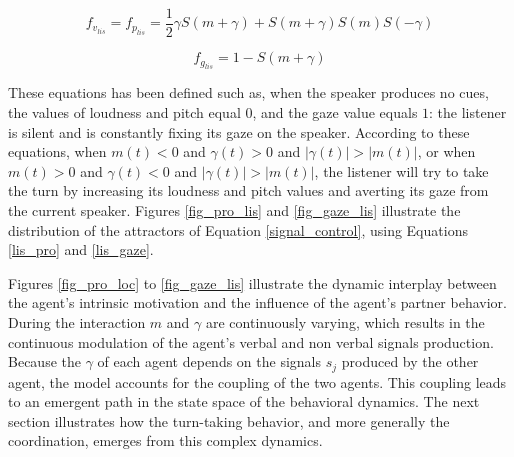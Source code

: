 \begin{equation}
f_{v_{lis}}= f_{p_{lis}} = \frac{1}{2} \gamma S(m+\gamma) + S(m+\gamma)S(m)S(-\gamma)
\label{lis_pro}
\end{equation}

\begin{equation}
f_{g_{lis}} = 1 - S(m + \gamma)
\label{lis_gaze}
\end{equation}

These equations has been defined such as, when the speaker produces no cues, the values of loudness and pitch equal $0$, and the gaze value equals $1$: the listener is silent and is constantly fixing its gaze on the speaker. 
According to these equations, when $m(t)<0$ and $\gamma(t)>0$ and $|\gamma(t)|>|m(t)|$, or when $m(t)>0$ and $\gamma(t)<0$ and $|\gamma(t)|>|m(t)|$, the listener will try to take the turn by increasing its loudness and pitch values and averting its gaze from the current speaker. Figures \ref{fig_pro_lis} and \ref{fig_gaze_lis} illustrate the distribution of the attractors of Equation \ref{signal_control}, using Equations \ref{lis_pro} and \ref{lis_gaze}.

Figures \ref{fig_pro_loc} to \ref{fig_gaze_lis} illustrate the dynamic interplay between the agent's intrinsic motivation and the influence of the agent's partner behavior.
During the interaction $m$ and $\gamma$ are continuously varying, which results in the continuous modulation of the agent's verbal and non verbal signals production. Because the $\gamma$ of each agent depends on the signals $s_j$ produced by the other agent, the model accounts for the coupling of the two agents. This coupling leads to an emergent path in the state space of the behavioral dynamics. The next section illustrates how the turn-taking behavior, and more generally the coordination, emerges from this complex dynamics. 


